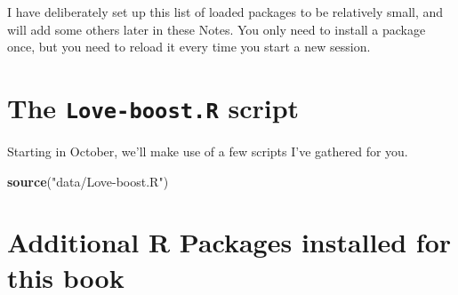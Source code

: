 \documentclass[
]{book}
\newenvironment{Shaded}{\begin{snugshade}}{\end{snugshade}}
\newcommand{\CommentTok}[1]{\textcolor[rgb]{0.56,0.35,0.01}{\textit{#1}}}
\newcommand{\DataTypeTok}[1]{\textcolor[rgb]{0.13,0.29,0.53}{#1}}
\newcommand{\KeywordTok}[1]{\textcolor[rgb]{0.13,0.29,0.53}{\textbf{#1}}}
\newcommand{\NormalTok}[1]{#1}
\newcommand{\OperatorTok}[1]{\textcolor[rgb]{0.81,0.36,0.00}{\textbf{#1}}}
\newcommand{\OtherTok}[1]{\textcolor[rgb]{0.56,0.35,0.01}{#1}}
\newcommand{\StringTok}[1]{\textcolor[rgb]{0.31,0.60,0.02}{#1}}
\begin{document}
\begin{Shaded}
\end{Shaded}

I have deliberately set up this list of loaded packages to be relatively small, and will add some others later in these Notes. You only need to install a package once, but you need to reload it every time you start a new session.

\hypertarget{the-love-boost.r-script}{%
\section*{\texorpdfstring{The \texttt{Love-boost.R} script}{The Love-boost.R script}}\label{the-love-boost.r-script}}

Starting in October, we'll make use of a few scripts I've gathered for you.

\begin{Shaded}
\begin{Highlighting}[]
\KeywordTok{source}\NormalTok{(}\StringTok{"data/Love-boost.R"}\NormalTok{)}
\end{Highlighting}
\end{Shaded}

\hypertarget{additional-r-packages-installed-for-this-book}{%
\section*{Additional R Packages installed for this book}\label{additional-r-packages-installed-for-this-book}}
\end{document}
